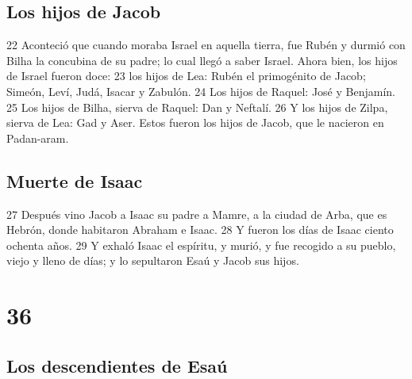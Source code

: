 \section*{Los hijos de Jacob}

22 Aconteció que cuando moraba Israel en aquella tierra, fue Rubén y durmió con Bilha la concubina de su padre; lo cual llegó a saber Israel. Ahora bien, los hijos de Israel fueron doce:
23 los hijos de Lea: Rubén el primogénito de Jacob; Simeón, Leví, Judá, Isacar y Zabulón.
24 Los hijos de Raquel: José y Benjamín.
25 Los hijos de Bilha, sierva de Raquel: Dan y Neftalí.
26 Y los hijos de Zilpa, sierva de Lea: Gad y Aser. Estos fueron los hijos de Jacob, que le nacieron en Padan-aram.

\section*{Muerte de Isaac}

27 Después vino Jacob a Isaac su padre a Mamre, a la ciudad de Arba, que es Hebrón, donde habitaron Abraham e Isaac.
28 Y fueron los días de Isaac ciento ochenta años.
29 Y exhaló Isaac el espíritu, y murió, y fue recogido a su pueblo, viejo y lleno de días; y lo sepultaron Esaú y Jacob sus hijos.

\chapter{36}

\section*{Los descendientes de Esaú}


